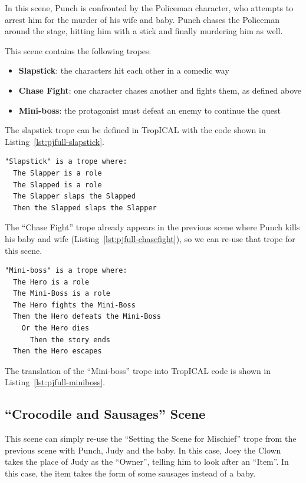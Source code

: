 \documentclass[11pt]{report}
\begin{document}
In this scene, Punch is confronted by the Policeman character, who attempts to
arrest him for the murder of his wife and baby. Punch chases the Policeman
around the stage, hitting him with a stick and finally murdering him as well.

This scene contains the following tropes:

\begin{itemize}
\item \textbf{Slapstick}: the characters hit each other in a comedic way
\item \textbf{Chase Fight}: one character chases another and fights them, as defined above
\item \textbf{Mini-boss}: the protagonist must defeat an enemy to continue the quest
\end{itemize}

The slapstick trope can be defined in TropICAL with the code shown in Listing~\ref{lst:pjfull-slapstick}.

\begin{lstlisting}[showstringspaces=false, label={lst:pjfull-slapstick}, caption={The ``Slapstick'' trope}]
"Slapstick" is a trope where:
  The Slapper is a role
  The Slapped is a role
  The Slapper slaps the Slapped
  Then the Slapped slaps the Slapper
\end{lstlisting}

The ``Chase Fight'' trope already appears in the previous scene where Punch kills his baby and wife (Listing~\ref{lst:pjfull-chasefight}), 
so we can re-use that trope for this scene.

\begin{lstlisting}[showstringspaces=false, label=lst:pjfull-miniboss,caption={The
``Mini-boss'' trope in TropICAL}]
"Mini-boss" is a trope where:
  The Hero is a role
  The Mini-Boss is a role
  The Hero fights the Mini-Boss
  Then the Hero defeats the Mini-Boss
    Or the Hero dies
      Then the story ends
  Then the Hero escapes
\end{lstlisting}

The translation of the ``Mini-boss'' trope into TropICAL code is shown in Listing~\ref{lst:pjfull-miniboss}.

\subsection{``Crocodile and Sausages'' Scene}

This scene can simply re-use the ``Setting the Scene for Mischief'' trope from
the previous scene with Punch, Judy and the baby. In this case, Joey the Clown
takes the place of Judy as the ``Owner'', telling him to look after an ``Item''.
In this case, the item takes the form of some sausages instead of a baby.
\end{document}
